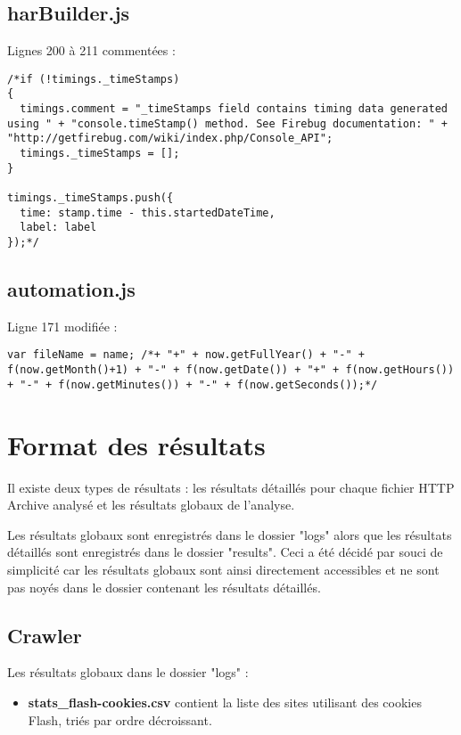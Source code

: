 \section*{harBuilder.js}
\label{harBuilder}
Lignes 200 à 211 commentées :
\begin{lstlisting}[frame=single]
/*if (!timings._timeStamps)
{
  timings.comment = "_timeStamps field contains timing data generated using " + "console.timeStamp() method. See Firebug documentation: " + "http://getfirebug.com/wiki/index.php/Console_API";
  timings._timeStamps = [];
}

timings._timeStamps.push({
  time: stamp.time - this.startedDateTime,
  label: label
});*/
\end{lstlisting}

\section*{automation.js}
\label{automation}
Ligne 171 modifiée :
\begin{lstlisting}[frame=single]
var fileName = name; /*+ "+" + now.getFullYear() + "-" + f(now.getMonth()+1) + "-" + f(now.getDate()) + "+" + f(now.getHours()) + "-" + f(now.getMinutes()) + "-" + f(now.getSeconds());*/
\end{lstlisting}


\chapter{Format des résultats}
\label{format_resultats}
Il existe deux types de résultats : les résultats détaillés pour chaque fichier HTTP Archive analysé et les résultats globaux de l'analyse.

Les résultats globaux sont enregistrés dans le dossier "logs" alors que les résultats détaillés sont enregistrés dans le dossier "results".
Ceci a été décidé par souci de simplicité car les résultats globaux sont ainsi directement accessibles et ne sont pas noyés dans le dossier contenant les résultats détaillés.

\section*{Crawler}
Les résultats globaux dans le dossier "logs" :
\begin{itemize}
	\item \textbf{stats\_flash-cookies.csv} contient la liste des sites utilisant des cookies Flash, triés par ordre décroissant.
\end{itemize}

